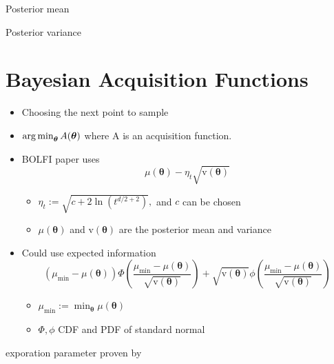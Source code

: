 Posterior mean

Posterior variance

\section{Bayesian Acquisition Functions}

\begin{itemize}
    \item Choosing the next point to sample
    \item $\operatorname*{arg\,min}_{\bm{\theta}}A(\bm\theta)$ where A is an acquisition function.
    \item BOLFI paper uses $$\mu(\bm\theta) - \eta_t\sqrt{\mathrm{v}(\bm\theta)}$$ \begin{itemize}
              \item $\eta_t:= \sqrt{c + 2\ln(t^{d/2 + 2})},$ and $c$ can be chosen
              \item $\mu(\bm\theta)$ and $\mathrm{v}(\bm\theta)$ are the posterior mean and variance
          \end{itemize}
          
    \item Could use expected information $$(\mu_\text{min} - \mu(\bm\theta))
              \varPhi\left(\frac{\mu_\text{min} - \mu(\bm\theta)}{\sqrt{\mathrm{v}(\bm\theta)}}\right) + \sqrt{\mathrm{v}(\bm\theta)}
              \phi\left(\frac{\mu_\text{min} - \mu(\bm\theta)}{\sqrt{\mathrm{v}(\bm\theta)}}\right)$$\begin{itemize}
              \item $\mu_\text{min} := \min_{\bm{\theta}} \mu(\bm\theta)$
              \item $\varPhi, \phi$ CDF and PDF of standard normal
          \end{itemize}
\end{itemize}

exporation parameter proven by \cite{srinivas_gaussian_2010}